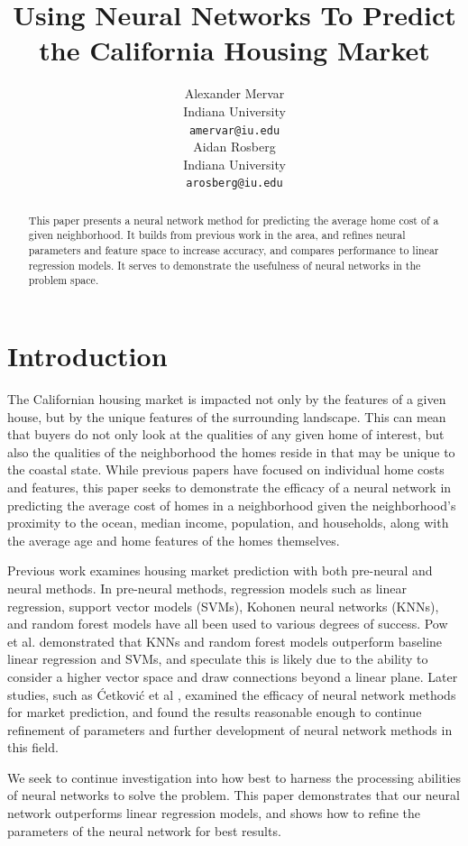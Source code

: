 \documentclass[11pt]{article}
\title{Using Neural Networks To Predict the California Housing Market}
\author{Alexander Mervar \\
 Indiana University \\
 \texttt{amervar@iu.edu} \\\And
 Aidan Rosberg \\
 Indiana University \\
 \texttt{arosberg@iu.edu}\\}
\begin{document}
\maketitle
\begin{abstract}
This paper presents a neural network method for predicting the average home cost of a given neighborhood. It builds from previous work in the area, and refines neural parameters and feature space to increase accuracy, and compares performance to linear regression models. It serves to demonstrate the usefulness of neural networks in the problem space.
\end{abstract}

\section{Introduction}

The Californian housing market is impacted not only by the features of a given house, but by the unique features of the surrounding landscape. This can mean that buyers do not only look at the qualities of any given home of interest, but also the qualities of the neighborhood the homes reside in that may be unique to the coastal state. While previous papers have focused on individual home costs and features, this paper seeks to demonstrate the efficacy of a neural network in predicting the average cost of homes in a neighborhood given the neighborhood’s proximity to the ocean, median income, population, and households, along with the average age and home features of the homes themselves.

Previous work examines housing market prediction with both pre-neural and neural methods. In pre-neural methods, regression models such as linear regression, support vector models (SVMs), Kohonen neural networks (KNNs), and random forest models have all been used to various degrees of success. Pow et al. \cite{Pow2014} demonstrated that KNNs and random forest models outperform baseline linear regression and SVMs, and speculate this is likely due to the ability to consider a higher vector space and draw connections beyond a linear plane. Later studies, such as Ćetković et al \cite{Cetkovic2018}, examined the efficacy of neural network methods for market prediction, and found the results reasonable enough to continue refinement of parameters and further development of neural network methods in this field.

We seek to continue investigation into how best to harness the processing abilities of neural networks to solve the problem. This paper demonstrates that our neural network outperforms linear regression models, and shows how to refine the parameters of the neural network for best results.
\end{document}
